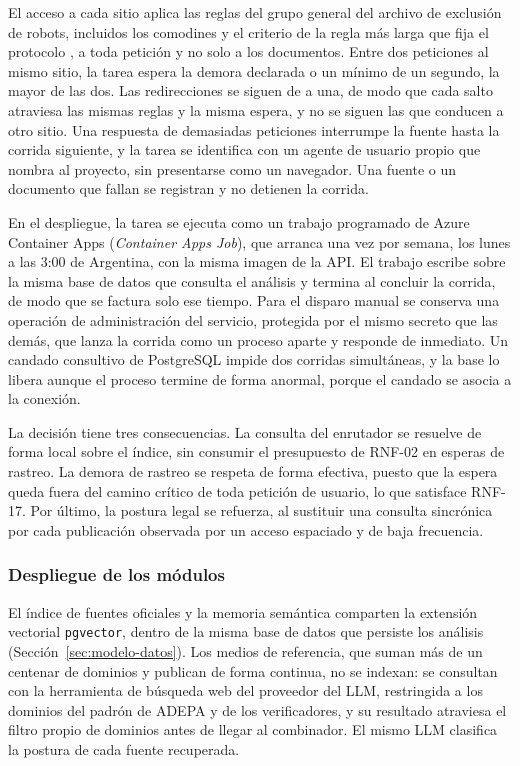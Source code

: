 El acceso a cada sitio aplica las reglas del grupo general del archivo de exclusión de robots, incluidos los comodines y el criterio de la regla más larga que fija el protocolo \parencite{KosterEtAl2022}, a toda petición y no solo a los documentos. Entre dos peticiones al mismo sitio, la tarea espera la demora declarada o un mínimo de un segundo, la mayor de las dos. Las redirecciones se siguen de a una, de modo que cada salto atraviesa las mismas reglas y la misma espera, y no se siguen las que conducen a otro sitio. Una respuesta de demasiadas peticiones interrumpe la fuente hasta la corrida siguiente, y la tarea se identifica con un agente de usuario propio que nombra al proyecto, sin presentarse como un navegador. Una fuente o un documento que fallan se registran y no detienen la corrida.

En el despliegue, la tarea se ejecuta como un trabajo programado de Azure Container Apps (\textit{Container Apps Job}), que arranca una vez por semana, los lunes a las 3:00 de Argentina, con la misma imagen de la API. El trabajo escribe sobre la misma base de datos que consulta el análisis y termina al concluir la corrida, de modo que se factura solo ese tiempo. Para el disparo manual se conserva una operación de administración del servicio, protegida por el mismo secreto que las demás, que lanza la corrida como un proceso aparte y responde de inmediato. Un candado consultivo de PostgreSQL impide dos corridas simultáneas, y la base lo libera aunque el proceso termine de forma anormal, porque el candado se asocia a la conexión.

La decisión tiene tres consecuencias. La consulta del enrutador se resuelve de forma local sobre el índice, sin consumir el presupuesto de RNF-02 en esperas de rastreo. La demora de rastreo se respeta de forma efectiva, puesto que la espera queda fuera del camino crítico de toda petición de usuario, lo que satisface RNF-17. Por último, la postura legal se refuerza, al sustituir una consulta sincrónica por cada publicación observada por un acceso espaciado y de baja frecuencia.

\subsubsection{Despliegue de los módulos}
\label{sec:alcance-implementado}

El índice de fuentes oficiales y la memoria semántica comparten la extensión vectorial \texttt{pgvector}, dentro de la misma base de datos que persiste los análisis (Sección~\ref{sec:modelo-datos}). Los medios de referencia, que suman más de un centenar de dominios y publican de forma continua, no se indexan: se consultan con la herramienta de búsqueda web del proveedor del LLM, restringida a los dominios del padrón de ADEPA y de los verificadores, y su resultado atraviesa el filtro propio de dominios antes de llegar al combinador. El mismo LLM clasifica la postura de cada fuente recuperada.

